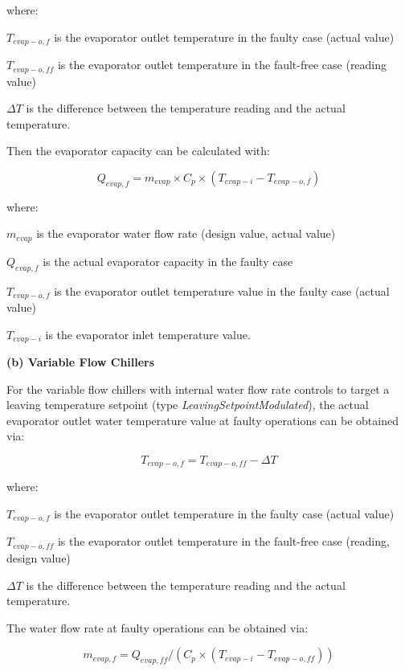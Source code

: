 where:

\(T_{evap-o,f}\) is the evaporator outlet temperature in the faulty case (actual value)

\(T_{evap-o,ff}\) is the evaporator outlet temperature in the fault-free case (reading value)

\(\Delta T\) is the difference between the temperature reading and the actual temperature.

Then the evaporator capacity can be calculated with:

\begin{equation}
Q_{evap,f} = m_{evap} \times C_p \times (T_{evap-i} - T_{evap-o,f} )
\end{equation}

where:

\(m_{evap}\) is the evaporator water flow rate (design value, actual value)

\(Q_{evap,f}\) is the actual evaporator capacity in the faulty case

\(T_{evap-o,f}\) is the evaporator outlet temperature value in the faulty case (actual value)

\(T_{evap-i}\) is the evaporator inlet temperature value. \newline

\textbf{(b) Variable Flow Chillers}

For the variable flow chillers with internal water flow rate controls to target a leaving temperature setpoint (type \emph{LeavingSetpointModulated}), the actual evaporator outlet water temperature value at faulty operations can be obtained via:

\begin{equation}
T_{evap-o,f} = T_{evap-o,ff} - \Delta T
\end{equation}

where:

\(T_{evap-o,f}\) is the evaporator outlet temperature in the faulty case (actual value)

\(T_{evap-o,ff}\) is the evaporator outlet temperature in the fault-free case (reading, design value)

\(\Delta T\) is the difference between the temperature reading and the actual temperature.

The water flow rate at faulty operations can be obtained via:

\begin{equation}
m_{evap,f} = Q_{evap,ff} / ( C_p \times (T_{evap-i} - T_{evap-o,ff} ) )
\end{equation}

